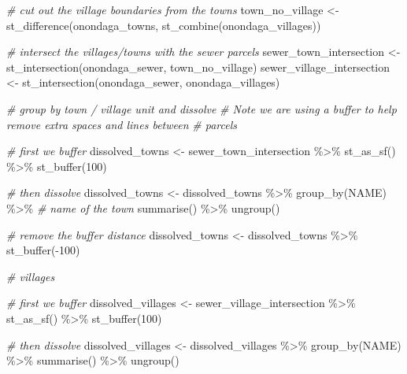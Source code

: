 \documentclass[
]{book}
\newenvironment{Shaded}{\begin{snugshade}}{\end{snugshade}}
\newcommand{\CommentTok}[1]{\textcolor[rgb]{0.56,0.35,0.01}{\textit{#1}}}
\newcommand{\DecValTok}[1]{\textcolor[rgb]{0.00,0.00,0.81}{#1}}
\newcommand{\FunctionTok}[1]{\textcolor[rgb]{0.00,0.00,0.00}{#1}}
\newcommand{\NormalTok}[1]{#1}
\newcommand{\OtherTok}[1]{\textcolor[rgb]{0.56,0.35,0.01}{#1}}
\newcommand{\SpecialCharTok}[1]{\textcolor[rgb]{0.00,0.00,0.00}{#1}}
\begin{document}
\begin{Shaded}
\begin{Highlighting}[]
\CommentTok{\# cut out the village boundaries from the towns}
\NormalTok{town\_no\_village }\OtherTok{\textless{}{-}}\FunctionTok{st\_difference}\NormalTok{(onondaga\_towns, }\FunctionTok{st\_combine}\NormalTok{(onondaga\_villages))}

\CommentTok{\# intersect the villages/towns with the sewer parcels}
\NormalTok{sewer\_town\_intersection }\OtherTok{\textless{}{-}} \FunctionTok{st\_intersection}\NormalTok{(onondaga\_sewer, town\_no\_village)}
\NormalTok{sewer\_village\_intersection }\OtherTok{\textless{}{-}} \FunctionTok{st\_intersection}\NormalTok{(onondaga\_sewer, onondaga\_villages)}

\CommentTok{\# group by town / village unit and dissolve}
\CommentTok{\# Note we are using a buffer to help remove extra spaces and lines between }
\CommentTok{\# parcels}

\CommentTok{\# first we buffer}
\NormalTok{dissolved\_towns }\OtherTok{\textless{}{-}}\NormalTok{ sewer\_town\_intersection }\SpecialCharTok{\%\textgreater{}\%}
  \FunctionTok{st\_as\_sf}\NormalTok{() }\SpecialCharTok{\%\textgreater{}\%}
  \FunctionTok{st\_buffer}\NormalTok{(}\DecValTok{100}\NormalTok{)}

\CommentTok{\# then dissolve}
\NormalTok{dissolved\_towns }\OtherTok{\textless{}{-}}\NormalTok{ dissolved\_towns }\SpecialCharTok{\%\textgreater{}\%} 
  \FunctionTok{group\_by}\NormalTok{(NAME) }\SpecialCharTok{\%\textgreater{}\%} \CommentTok{\# name of the town}
  \FunctionTok{summarise}\NormalTok{() }\SpecialCharTok{\%\textgreater{}\%}
  \FunctionTok{ungroup}\NormalTok{()}

\CommentTok{\# remove the buffer distance}
\NormalTok{dissolved\_towns }\OtherTok{\textless{}{-}}\NormalTok{ dissolved\_towns }\SpecialCharTok{\%\textgreater{}\%}
  \FunctionTok{st\_buffer}\NormalTok{(}\SpecialCharTok{{-}}\DecValTok{100}\NormalTok{) }

\CommentTok{\# villages}

\CommentTok{\# first we buffer}
\NormalTok{dissolved\_villages }\OtherTok{\textless{}{-}}\NormalTok{ sewer\_village\_intersection }\SpecialCharTok{\%\textgreater{}\%}
  \FunctionTok{st\_as\_sf}\NormalTok{() }\SpecialCharTok{\%\textgreater{}\%}
  \FunctionTok{st\_buffer}\NormalTok{(}\DecValTok{100}\NormalTok{)}

\CommentTok{\# then dissolve}
\NormalTok{dissolved\_villages }\OtherTok{\textless{}{-}}\NormalTok{ dissolved\_villages }\SpecialCharTok{\%\textgreater{}\%} 
  \FunctionTok{group\_by}\NormalTok{(NAME) }\SpecialCharTok{\%\textgreater{}\%}
  \FunctionTok{summarise}\NormalTok{() }\SpecialCharTok{\%\textgreater{}\%}
  \FunctionTok{ungroup}\NormalTok{()}


\end{Highlighting}
\end{Shaded}
\end{document}
